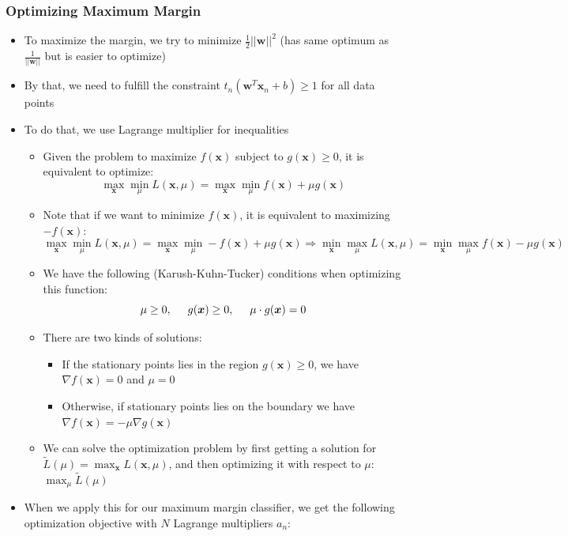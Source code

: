 \subsubsection{Optimizing Maximum Margin}
\begin{itemize}
	\item To maximize the margin, we try to minimize $\frac{1}{2}||\bm{w}||^2$ (has same optimum as $\frac{1}{||\bm{w}||}$ but is easier to optimize)
	\item By that, we need to fulfill the constraint $t_n \left(\bm{w}^T\bm{x}_n + b\right) \geq 1$ for all data points
	\item To do that, we use Lagrange multiplier for inequalities
	\begin{itemize}
		\item Given the problem to maximize $f(\bm{x})$ subject to $g(\bm{x})\geq 0$, it is equivalent to optimize:
		$$\max_{\bm{x}} \min_{\mu} L\left(\bm{x},\mu\right) = \max_{\bm{x}} \min_{\mu} f(\bm{x}) + \mu g(\bm{x})$$
		\item Note that if we want to minimize $f(\bm{x})$, it is equivalent to maximizing $-f(\bm{x})$: 
		$$\max_{\bm{x}} \min_{\mu} L\left(\bm{x},\mu\right) = \max_{\bm{x}} \min_{\mu} -f(\bm{x}) + \mu g(\bm{x}) \Rightarrow \min_{\bm{x}} \max_{\mu} L\left(\bm{x},\mu\right) = \min_{\bm{x}} \max_{\mu} f(\bm{x}) - \mu g(\bm{x})$$
		\item We have the following (Karush-Kuhn-Tucker) conditions when optimizing this function:
		$$\mu\geq0, \text{\hspace{5mm}}g(\bm{x})\geq0, \text{\hspace{5mm}}\mu\cdot g(\bm{x}) = 0$$
		\item There are two kinds of solutions:
		\begin{itemize}
			\item If the stationary points lies in the region $g(\bm{x})\geq 0$, we have $\nabla f(\bm{x})=0$ and $\mu=0$
			\item Otherwise, if stationary points lies on the boundary we have $\nabla f(\bm{x})=-\mu \nabla g(\bm{x})$
		\end{itemize}
		\item We can solve the optimization problem by first getting a solution for $\tilde{L}(\mu) = \max_{\bm{x}} L(\bm{x},\mu)$, and then optimizing it with respect to $\mu$: $\max_{\mu}\tilde{L}(\mu)$
	\end{itemize}
	\item When we apply this for our maximum margin classifier, we get the following optimization objective with $N$ Lagrange multipliers $a_n$:

\end{itemize}
